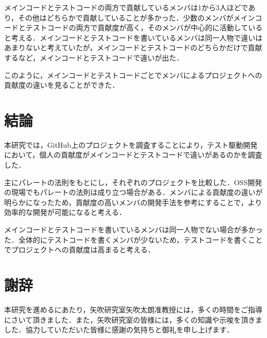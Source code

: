 \newpage

メインコードとテストコードの両方で貢献しているメンバは1から3人ほどであり，その他はどちらかで貢献していることが多かった．少数のメンバがメインコードとテストコードの両方で貢献度が高く，そのメンバが中心的に活動していると考える．メインコードとテストコードを書いているメンバは同一人物で違いはあまりないと考えていたが，メインコードとテストコードのどちらかだけで貢献するなど，メインコードとテストコードで違いが出た．

このように，メインコードとテストコードごとでメンバによるプロジェクトへの貢献度の違いを見ることができた．



\chapter{結論}

本研究では，GitHub上のプロジェクトを調査することにより，テスト駆動開発において，個人の貢献度がメインコードとテストコードで違いがあるのかを調査した．

主にパレートの法則をもとにし，それぞれのプロジェクトを比較した．OSS開発の現場でもパレートの法則は成り立つ場合がある．メンバによる貢献度の違いが明らかになったため，貢献度の高いメンバの開発手法を参考にすることで，より効率的な開発が可能になると考える．

メインコードとテストコードを書いているメンバは同一人物でない場合が多かった．全体的にテストコードを書くメンバが少ないため，テストコードを書くことでプロジェクトへの貢献度は高まると考える．







\chapter{謝辞}

本研究を進めるにあたり，矢吹研究室矢吹太朗准教授には，多くの時間をご指導にさいて頂きました．また，矢吹研究室の皆様には，多くの知識や示唆を頂きました．協力していただいた皆様に感謝の気持ちと御礼を申し上げます．



